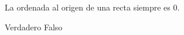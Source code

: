 La ordenada al origen de una recta siempre es 0.

\begin{oneparchoices}
    \choice Verdadero
    \CorrectChoice Falso
\end{oneparchoices}